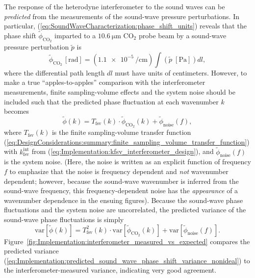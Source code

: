 The response of the heterodyne interferometer to the sound waves
can be \emph{predicted} from the measurements
of the sound-wave pressure perturbations.
In particular,
(\ref{eq:SoundWaveCharacterization:phase_shift_units})
reveals that the phase shift $\tilde{\phi}_{\text{CO}_2}$
imparted to a $\SI{10.6}{\micro\meter}$ CO$_2$ probe beam
by a sound-wave pressure perturbation $\tilde{p}$ is
\begin{equation}
  \tilde{\phi}_{\text{CO}_2} \, [\text{rad}]
  =
  (\SI{1.1e-5}{\per\centi\meter})
  \int
  (\tilde{p} \; [\text{Pa}])
  dl,
  \label{eq:Implementation:predicted_sound_wave_phase_shift_ideal}
\end{equation}
where the differential path length $dl$ must have units of centimeters.
However, to make a true ``apples-to-apples'' comparison
with the interferometer measurements,
finite sampling-volume effects and the system noise should be included
such that the predicted phase fluctuation at each wavenumber $k$ becomes
\begin{equation}
  \tilde{\phi}(k)
  =
  T_{\text{fsv}}(k)
  \cdot
  \tilde{\phi}_{\text{CO}_2}(k)
  +
  \tilde{\phi}_{\text{noise}}(f),
  \label{eq:Implementation:predicted_sound_wave_phase_shift_nonideal}
\end{equation}
where
$T_{\text{fsv}}(k)$ is the finite sampling-volume transfer function
(\ref{eq:DesignConsiderations:summary:finite_sampling_volume_transfer_function})
with $k_{\text{fsv}}^{\text{int}}$ from
(\ref{eq:Implementation:kfsv_interferometer_design}),
and $\tilde{\phi}_{\text{noise}}(f)$ is the system noise.
(Here, the noise is written as an explicit function of frequency $f$
to emphasize that the noise is frequency dependent and
\emph{not} wavenumber dependent;
however, because the sound-wave wavenumber is inferred
from the sound-wave frequency,
this frequency-dependent noise
has the \emph{appearance} of a wavenumber dependence
in the ensuing figures).
Because the sound-wave phase fluctuations and
the system noise are uncorrelated,
the predicted variance of the sound-wave phase fluctuations is simply
\begin{equation}
  \text{var}\left[
    \tilde{\phi}(k)
  \right]
  =
  T^2_{\text{fsv}}(k)
  \cdot
  \text{var}\left[
    \tilde{\phi}_{\text{CO}_2}(k)
  \right]
  +
  \text{var}\left[
    \tilde{\phi}_{\text{noise}}(f)
  \right].
  \label{eq:Implementation:predicted_sound_wave_phase_shift_variance_nonideal}
\end{equation}
Figure~\ref{fig:Implementation:interferometer_measured_vs_expected}
compares the predicted variance
(\ref{eq:Implementation:predicted_sound_wave_phase_shift_variance_nonideal})
to the interferometer-measured variance,
indicating very good agreement.


